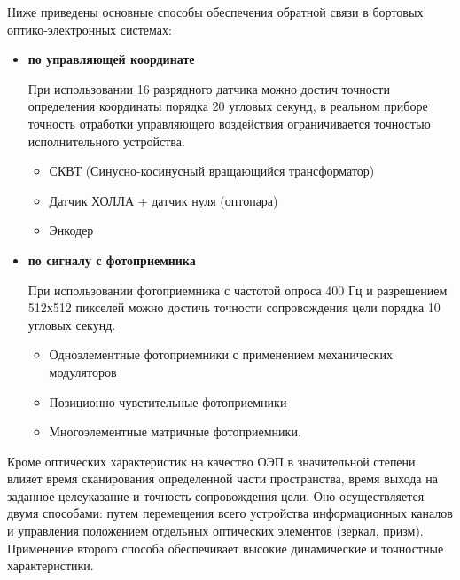 Ниже приведены основные способы обеспечения обратной связи в бортовых оптико-электронных системах:
\begin{itemize}
	\item \textbf{по управляющей координате}
	
	При использовании 16 разрядного датчика можно достич точности определения координаты порядка 20 угловых секунд, в реальном приборе точность отработки управляющего воздействия ограничивается точностью исполнительного устройства.
	
	\begin{itemize}
		\item СКВТ (Синусно-косинусный вращающийся трансформатор)
		\item Датчик ХОЛЛА + датчик нуля (оптопара)
		\item Энкодер
	\end{itemize}
		
	\item \textbf{по сигналу с фотоприемника} 
	
	При использовании фотоприемника с частотой опроса 400 Гц и разрешением 512х512 пикселей можно достичь точности сопровождения цели порядка 10 угловых секунд.
	
	\begin{itemize}
		\item Одноэлементные фотоприемники с применением механических модуляторов
		\item Позиционно чувстительные фотоприемники		
		\item Многоэлементные матричные фотоприемники.	
	\end{itemize}
	
	
\end{itemize}

\begin{comment}
Проведена оценка точности при использовании различных датчиков.Исследование влияния точности и принципа работы датчика проводится в главе \ref{ch:ch5} (\nameref{ch:ch5}).
\end{comment}

Кроме оптических характеристик на качество ОЭП в значительной степени влияет время сканирования определенной части пространства, время выхода на заданное целеуказание и точность сопровождения цели. Оно осуществляется двумя способами: путем перемещения всего устройства информационных каналов и управления положением отдельных оптических элементов (зеркал, призм). Применение второго способа обеспечивает высокие динамические и точностные характеристики. 

